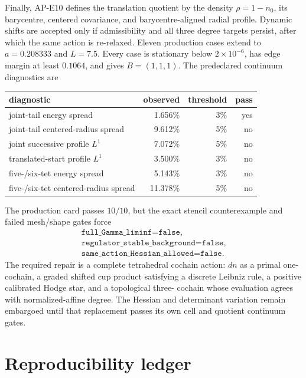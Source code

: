 \documentclass[11pt]{article}
\numberwithin{equation}{section}
\begin{document}
Finally, AP-E10 defines the translation quotient by the density
$\rho=1-n_0$, its barycentre, centered covariance, and barycentre-aligned
radial profile.  Dynamic shifts are accepted only if admissibility and all
three degree targets persist, after which the same action is re-relaxed.
Eleven production cases extend to $a=0.208333$ and $L=7.5$.  Every case is
stationary below $2\times10^{-6}$, has edge margin at least $0.1064$, and
gives $B=(1,1,1)$.  The predeclared continuum diagnostics are
\begin{center}
\begin{tabular}{lrrr}
\toprule
diagnostic&observed&threshold&pass\\
\midrule
joint-tail energy spread&1.656\%&3\%&yes\\
joint-tail centered-radius spread&9.612\%&5\%&no\\
joint successive profile $L^1$&7.072\%&5\%&no\\
translated-start profile $L^1$&3.500\%&3\%&no\\
five-/six-tet energy spread&5.143\%&3\%&no\\
five-/six-tet centered-radius spread&11.378\%&5\%&no\\
\bottomrule
\end{tabular}
\end{center}
The production card passes $10/10$, but the exact stencil counterexample and
failed mesh/shape gates force
\begin{equation}
 \boxed{\begin{gathered}
 \texttt{full\_Gamma\_liminf=false},\\
 \texttt{regulator\_stable\_background=false},\\
 \texttt{same\_action\_Hessian\_allowed=false}.
 \end{gathered}}
 \label{eq:e10-decision}
\end{equation}
The required repair is a complete tetrahedral cochain action: $dn$ as a
primal one-cochain, a graded shifted cup product satisfying a discrete
Leibniz rule, a positive calibrated Hodge star, and a topological three-
cochain whose evaluation agrees with normalized-affine degree.  The Hessian
and determinant variation remain embargoed until that replacement passes its
own cell and quotient continuum gates.





\section{Reproducibility ledger}
\end{document}
